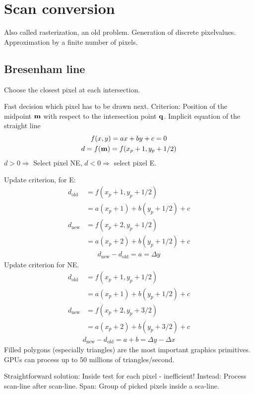 \chapter{Scan conversion}
Also called rasterization, an old problem. Generation of discrete pixelvalues. Approximation by a finite number of pixels. 
\section{Bresenham line}
Choose the closest pixel at each intersection. 
\begin{compactdesc}
	\item[\lp{Goal}]
 Fast decision which pixel has to be drawn next. Criterion: Position of the midpoint $\bm{\mathrm{m}}$ with respect to the intersection point $\bm{\mathrm{q}}$.
Implicit equation of the straight line
\begin{gather*}
	f(x,y)=ax+by+c=0\\
	d=f(\bm{\mathrm{m}})=f(x_p+1,y_p+1/2)
\end{gather*}
$d>0\Rightarrow$ Select pixel NE, $d<0\Rightarrow$ select pixel E.
\item[\lp{Update criterion}] 
Update criterion, for E:
\begin{align*}
	d_{\text{old}}&=f(x_p+1,y_p+1/2)\\
	&=a(x_p+1)+b(y_p+1/2)+c\\
	d_{\text{new}}&=f(x_p+2,y_p+1/2)\\
	&=a(x_p+2)+b(y_p+1/2)+c
\end{align*}
\begin{gather*}
	d_{\text{new}}-d_{\text{old}}=a=\Delta y
\end{gather*}
Update criterion for NE.
\begin{align*}
	d_{\text{old}}&=f(x_p+1,y_p+1/2)\\
	&=a(x_p+1)+b(y_p+1/2)+c\\
	d_{\text{new}}&=f(x_p+2,y_p+3/2)\\
	&=a(x_p+2)+b(y_p+3/2)+c
\end{align*}
\begin{gather*}
	d_{\text{new}}-d_{\text{old}}=a+b=\Delta y-\Delta x
\end{gather*}
Filled polygons (especially triangles) are the most important graphics primitives. GPUs can process up to 50 millions of triangles/second.
\item[\lp{Spatial coherence}] Straightforward solution: Inside test for each pixel - inefficient! Instead: Process scan-line after scan-line. Span: Group of picked pixels inside a sca-line.

\end{compactdesc}
